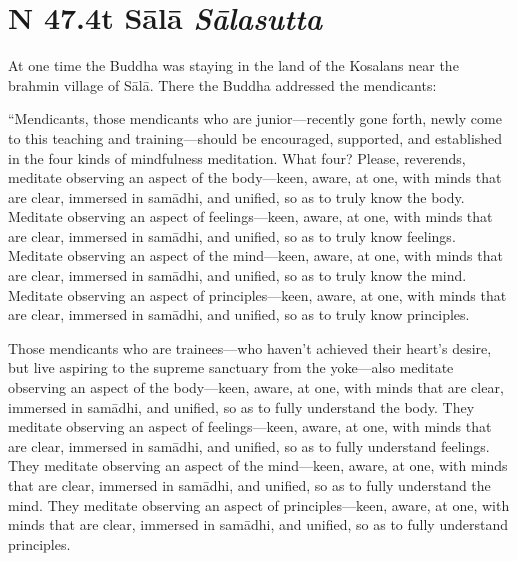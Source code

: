 \documentclass[12pt,openany]{book}%
\newcommand*{\suttatitleacronym}[1]{\smaller[2]{#1}\vspace*{.3em}}
\newcommand*{\suttatitletranslation}[1]{\linebreak{#1}}
\newcommand*{\suttatitleroot}[1]{\linebreak\smaller[2]\itshape{#1}}
\newcommand*{\tocacronym}[1]{\hspace*{-3.3em}{#1}\quad}
\newcommand*{\toctranslation}[1]{#1}
\newcommand*{\tocroot}[1]{(\textit{#1})}
\begin{document}
%
\section*{{\suttatitleacronym SN 47.4}{\suttatitletranslation At Sālā }{\suttatitleroot Sālasutta}}
\addcontentsline{toc}{section}{\tocacronym{SN 47.4} \toctranslation{At Sālā } \tocroot{Sālasutta}}

At one time the Buddha was staying in the land of the Kosalans near the brahmin village of \textsanskrit{Sālā}. There the Buddha addressed the mendicants: 

“Mendicants, those mendicants who are junior—recently gone forth, newly come to this teaching and training—should be encouraged, supported, and established in the four kinds of mindfulness meditation. What four? Please, reverends, meditate observing an aspect of the body—keen, aware, at one, with minds that are clear, immersed in \textsanskrit{samādhi}, and unified, so as to truly know the body. Meditate observing an aspect of feelings—keen, aware, at one, with minds that are clear, immersed in \textsanskrit{samādhi}, and unified, so as to truly know feelings. Meditate observing an aspect of the mind—keen, aware, at one, with minds that are clear, immersed in \textsanskrit{samādhi}, and unified, so as to truly know the mind. Meditate observing an aspect of principles—keen, aware, at one, with minds that are clear, immersed in \textsanskrit{samādhi}, and unified, so as to truly know principles. 

Those mendicants who are trainees—who haven’t achieved their heart’s desire, but live aspiring to the supreme sanctuary from the yoke—also meditate observing an aspect of the body—keen, aware, at one, with minds that are clear, immersed in \textsanskrit{samādhi}, and unified, so as to fully understand the body. They meditate observing an aspect of feelings—keen, aware, at one, with minds that are clear, immersed in \textsanskrit{samādhi}, and unified, so as to fully understand feelings. They meditate observing an aspect of the mind—keen, aware, at one, with minds that are clear, immersed in \textsanskrit{samādhi}, and unified, so as to fully understand the mind. They meditate observing an aspect of principles—keen, aware, at one, with minds that are clear, immersed in \textsanskrit{samādhi}, and unified, so as to fully understand principles. 
\end{document}
